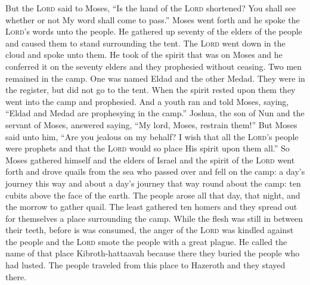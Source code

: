 \begin{inparaenum}
     But the \textsc{Lord} said to Moses, ``Is the hand of the \textsc{Lord} shortened? You shall see whether or not My word shall come to pass.''%
     Moses went forth and he spoke the \textsc{Lord}'s words unto the people. He gathered up seventy of the elders of the people and caused them to stand surrounding the tent.%
     The \textsc{Lord} went down in the cloud and spoke unto them. He took of the spirit that was on Moses and he conferred it on the seventy elders and they prophesied without ceasing.%
     Two men remained in the camp. One was named Eldad and the other Medad. They were in the register, but did not go to the tent. When the spirit rested upon them they went into the camp and prophesied.%
     And a youth ran and told Moses, saying, ``Eldad and Medad are prophesying in the camp.''%
     Joshua, the son of Nun and the servant of Moses, answered saying, ``My lord, Moses, restrain them!''%
     But Moses said unto him, ``Are you jealous on my behalf? I wish that all the \textsc{Lord}'s people were prophets and that the \textsc{Lord} would so place His spirit upon them all.''%
     So Moses gathered himself and the elders of Israel%
     and the spirit of the \textsc{Lord} went forth and drove quails from the sea who passed over and fell on the camp: a day's journey this way and about a day's journey that way round about the camp: ten cubits above the face of the earth.%
     The people arose all that day, that night, and the morrow to gather quail. The least gathered ten homers and they spread out for themselves a place surrounding the camp.%
     While the flesh was still in between their teeth, before is was consumed, the anger of the \textsc{Lord} was kindled against the people and the \textsc{Lord} smote the people with a great plague.%
     He called the name of that place Kibroth-hattaavah because there they buried the people who had lusted.%
     The people traveled from this place to Hazeroth and they stayed there.%
\end{inparaenum}

